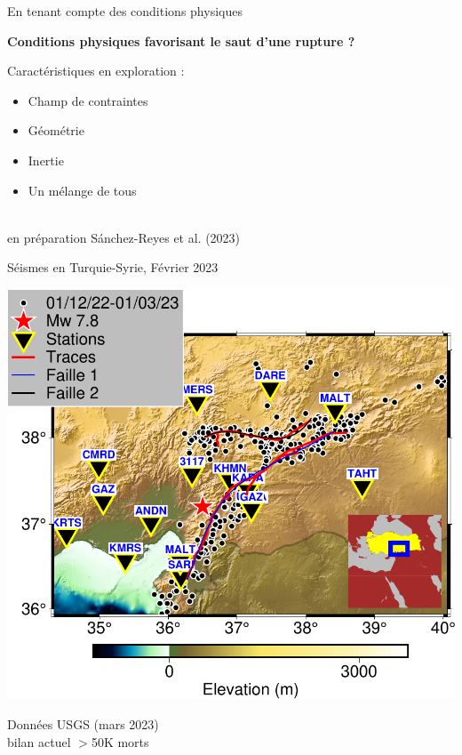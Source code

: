 \documentclass{beamer}
\begin{document}
\begin{frame}
 {En tenant compte des conditions physiques}

{\bf Conditions physiques favorisant le saut d'une rupture ?}

\begin{minipage}{0.5\linewidth}
  \hskip -3cm	 %
\end{minipage}
\begin{minipage}{0.48\linewidth}
\vskip -0.7cm Caractéristiques en exploration :
\vskip 0.1cm
\begin{itemize}
 \item Champ de contraintes
 \item Géométrie
 \item Inertie
 \item Un mélange de tous
\end{itemize}
\end{minipage} \\
\hfill \small en préparation Sánchez-Reyes et al. (2023)
\addtocounter{framenumber}{-1}

\end{frame}


\begin{frame}
 {Séismes en Turquie-Syrie, Février 2023}
 
\begin{center}
 \includegraphics[width=0.65\linewidth]{images/Map_Turkey} \\
\end{center} 
Données USGS (mars 2023) \\
\vskip -0.2cm
\hfill {\scriptsize bilan actuel $>$50K morts}
 
\end{frame}
\end{document}
